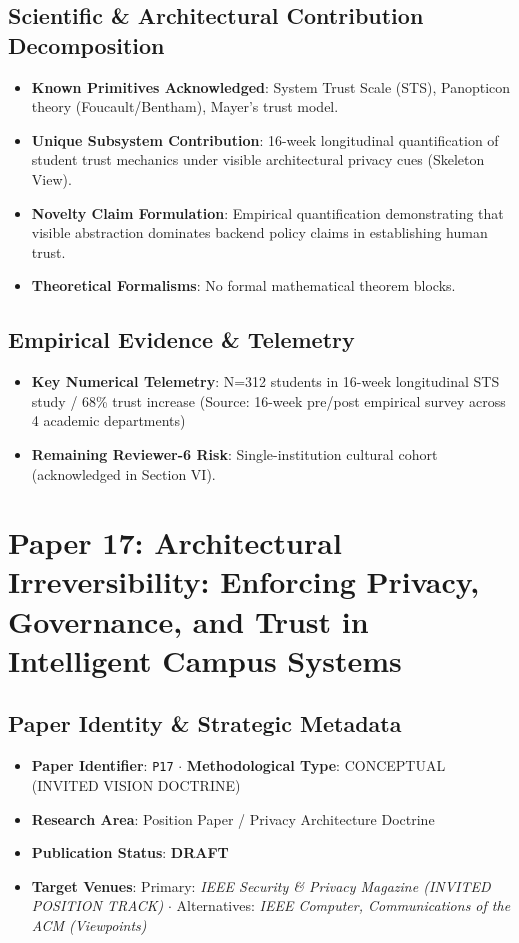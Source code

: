 \documentclass[11pt,a4paper]{article}
\begin{document}
\subsection*{Scientific & Architectural Contribution Decomposition}
\begin{itemize}[leftmargin=1.5em, itemsep=0.2em]
    \item \textbf{Known Primitives Acknowledged}: System Trust Scale (STS), Panopticon theory (Foucault/Bentham), Mayer's trust model.
    \item \textbf{Unique Subsystem Contribution}: 16-week longitudinal quantification of student trust mechanics under visible architectural privacy cues (Skeleton View).
    \item \textbf{Novelty Claim Formulation}: Empirical quantification demonstrating that visible abstraction dominates backend policy claims in establishing human trust.
    \item \textbf{Theoretical Formalisms}: No formal mathematical theorem blocks.
\end{itemize}

\subsection*{Empirical Evidence & Telemetry}
\begin{itemize}[leftmargin=1.5em, itemsep=0.2em]
    \item \textbf{Key Numerical Telemetry}: N=312 students in 16-week longitudinal STS study / 68\% trust increase (Source: 16-week pre/post empirical survey across 4 academic departments)
    \item \textbf{Remaining Reviewer-6 Risk}: Single-institution cultural cohort (acknowledged in Section VI).
\end{itemize}

\section{Paper 17: Architectural Irreversibility: Enforcing Privacy, Governance, and Trust in Intelligent Campus Systems}

\subsection*{Paper Identity \& Strategic Metadata}
\begin{itemize}[leftmargin=1.5em, itemsep=0.2em]
    \item \textbf{Paper Identifier}: \texttt{P17} $\cdot$ \textbf{Methodological Type}: CONCEPTUAL (INVITED VISION DOCTRINE)
    \item \textbf{Research Area}: Position Paper / Privacy Architecture Doctrine
    \item \textbf{Publication Status}: \textbf{DRAFT}
    \item \textbf{Target Venues}: Primary: \textit{IEEE Security \& Privacy Magazine (INVITED POSITION TRACK)} $\cdot$ Alternatives: \textit{IEEE Computer, Communications of the ACM (Viewpoints)}
\end{itemize}
\end{document}

